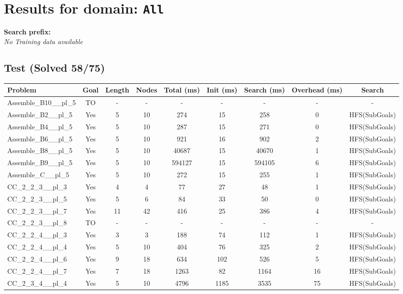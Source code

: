 \documentclass{article}
\begin{document}
\section*{Results for domain: \texttt{All}}
\textbf{Search prefix:} 
\\[0.5cm]
\textit{No Training data available}\\[0.5cm]
\subsection*{Test (Solved 58/75)}
\begin{tabular}{lcccccccc}
\toprule
Problem & Goal & Length & Nodes & Total (ms) & Init (ms) & Search (ms) & Overhead (ms) & Search \\
\midrule
Assemble\_B10\_\_pl\_5 & TO & - & - & - & - & - & - & - \\
Assemble\_B2\_\_pl\_5 & Yes & 5 & 10 & 274 & 15 & 258 & 0 & HFS(SubGoals) \\
Assemble\_B4\_\_pl\_5 & Yes & 5 & 10 & 287 & 15 & 271 & 0 & HFS(SubGoals) \\
Assemble\_B6\_\_pl\_5 & Yes & 5 & 10 & 921 & 16 & 902 & 2 & HFS(SubGoals) \\
Assemble\_B8\_\_pl\_5 & Yes & 5 & 10 & 40687 & 15 & 40670 & 1 & HFS(SubGoals) \\
Assemble\_B9\_\_pl\_5 & Yes & 5 & 10 & 594127 & 15 & 594105 & 6 & HFS(SubGoals) \\
Assemble\_C\_\_pl\_5 & Yes & 5 & 10 & 272 & 15 & 255 & 1 & HFS(SubGoals) \\
CC\_2\_2\_3\_\_pl\_3 & Yes & 4 & 4 & 77 & 27 & 48 & 1 & HFS(SubGoals) \\
CC\_2\_2\_3\_\_pl\_5 & Yes & 5 & 6 & 84 & 33 & 50 & 0 & HFS(SubGoals) \\
CC\_2\_2\_3\_\_pl\_7 & Yes & 11 & 42 & 416 & 25 & 386 & 4 & HFS(SubGoals) \\
CC\_2\_2\_3\_\_pl\_8 & TO & - & - & - & - & - & - & - \\
CC\_2\_2\_4\_\_pl\_3 & Yes & 3 & 3 & 188 & 74 & 112 & 1 & HFS(SubGoals) \\
CC\_2\_2\_4\_\_pl\_4 & Yes & 5 & 10 & 404 & 76 & 325 & 2 & HFS(SubGoals) \\
CC\_2\_2\_4\_\_pl\_6 & Yes & 9 & 18 & 634 & 102 & 526 & 5 & HFS(SubGoals) \\
CC\_2\_2\_4\_\_pl\_7 & Yes & 7 & 18 & 1263 & 82 & 1164 & 16 & HFS(SubGoals) \\
CC\_2\_3\_4\_\_pl\_4 & Yes & 5 & 10 & 4796 & 1185 & 3535 & 75 & HFS(SubGoals) \\

\end{tabular}
\end{document}
